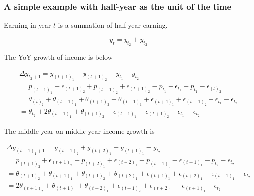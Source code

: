 \documentclass[12pt,notitlepage,onecolumn,aps,pra]{article}
\begin{document}
    \hypertarget{a-simple-example-with-half-year-as-the-unit-of-the-time}{%
\subsubsection{A simple example with half-year as the unit of the
time}\label{a-simple-example-with-half-year-as-the-unit-of-the-time}}

Earning in year \(t\) is a summation of half-year earning.

\begin{equation}
y_t = y_{t_2}+ y_{t_2} 
\end{equation}

The YoY growth of income is below

\begin{equation}
\begin{split}
\Delta y_{t_2+1} = y_{(t+1)_1}+ y_{(t+1)_2} - y_{t_1 } - y_{t_2}  \\
 = p_{(t+1)_1} + \epsilon_{(t+1)_2} + p_{(t+1)_2} + \epsilon_{(t+1)_2} - p_{t_1} - \epsilon_{t_1} - p_{t_1} - \epsilon_{(t)_2 } \\
 = \theta_{(t)_2} + \theta_{(t+1)_1} + \theta_{(t+1)_2} + \theta_{(t+1)_1} + \epsilon_{(t+1)_1} + \epsilon_{(t+1)_2} - \epsilon_{t_1} - \epsilon_{t_2} \\
 =  \theta_{t_2} + 2\theta_{(t+1)_1} + \theta_{(t+1)_2} + \epsilon_{(t+1)_1} + \epsilon_{(t+1)_2} - \epsilon_{t_1} - \epsilon_{t_2} 
\end{split}
\end{equation}

The middle-year-on-middle-year income growth is

\begin{equation}
\begin{split}
\Delta y_{(t+1)_1+1} = y_{(t+1)_2}+ y_{(t+2)_1} - y_{(t+1)_1} - y_{t_2}  \\
 = p_{(t+1)_2} + \epsilon_{(t+1)_2} + p_{(t+2)_1} + \epsilon_{(t+2)_1} - p_{(t+1)_1} - \epsilon_{(t+1)_1} - p_{t_2} - \epsilon_{t_2 } \\
 = \theta_{(t+1)_2} + \theta_{(t+1)_1} + \theta_{(t+1)_2} + \theta_{(t+2)_1} + \epsilon_{(t+1)_2} + \epsilon_{(t+2)_1} - \epsilon_{(t+1)_1} - \epsilon_{t_2 } \\
 = 2\theta_{(t+1)_2} + \theta_{(t+1)_1} + \theta_{(t+2)_1} + \epsilon_{(t+1)_2} + \epsilon_{(t+2)_1} - \epsilon_{(t+1)_1} - \epsilon_{t_2 }
\end{split}
\end{equation}
\end{document}
